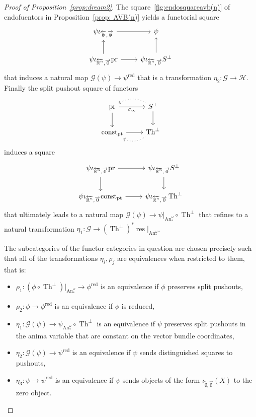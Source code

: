 \documentclass{article}
\newcommand{\R}{\mathbb{R}} %
\newcommand{\pt}{\mathrm{pt}}
\newcommand{\pr}{\mathrm{pr}}
\newcommand{\iotaemptyempty}{\iota_{\overleftarrow{\emptyset},\overrightarrow{\emptyset}}}
\newcommand{\iotarnzero}{\iota_{\overleftarrow{\R^n},\overrightarrow{0}}}
\DeclareMathOperator{\An}{An}
\DeclareMathOperator{\res}{res}
\DeclareMathOperator{\Th}{Th}
\begin{document}
\begin{proof}[Proof of Proposition~\ref{prop:dream2}]
    The square~\ref{fig:endosquareavb(n)} of endofucntors in Proposition~\ref{prop: AVB(n)} yields a functorial square 
    \[\begin{tikzcd}
        {\psi \iotaemptyempty} & \psi \\
        {\psi \iotarnzero \pr} & {\psi \iotarnzero S^\perp}
        \arrow[from=1-1, to=1-2]
        \arrow[from=2-2, to=1-2]
        \arrow[from=2-1, to=1-1]
        \arrow[from=2-1, to=2-2]
    \end{tikzcd}\]
    that induces a natural map $\mathcal G(\psi) \to \psi^\mathrm{red}$ that is a transformation $\eta_2 \colon \mathcal G \to \mathcal H$.
    Finally the split pushout square of functors 
    \[\begin{tikzcd}
        \pr & {S^\perp} \\
        {\mathrm{const}_{\pt}} & {\Th^\perp}
        \arrow["\sigma_\infty"', from=1-1, to=1-2]
        \arrow[from=1-2, to=2-2]
        \arrow[from=1-1, to=2-1]
        \arrow[from=2-1, to=2-2]
        \arrow[bend right=30, dotted, from=1-2, to=1-1]
        \arrow[bend left=30, dotted, from=2-2, to=2-1]
    \end{tikzcd}\]
    induces a square 
    \[\begin{tikzcd}
        {\psi \iotarnzero \pr} & {\psi \iotarnzero S^\perp} \\
        {\psi \iotarnzero \mathrm{const}_{\pt}} & {\psi \iotarnzero \Th^\perp}
        \arrow[from=1-1, to=1-2]
        \arrow[from=1-2, to=2-2]
        \arrow[from=1-1, to=2-1]
        \arrow[from=2-1, to=2-2]
    \end{tikzcd}\]
    that ultimately leads to a natural map $\mathcal G(\psi) \to \psi|_{\An_*^\omega} \circ \Th^\perp$ that refines 
    to a natural transformation 
    $ \eta_1 \colon \mathcal G \to (\Th^\perp)^* \res|_{\An_*^\omega}$.

    The subcategories of the functor categories in question are chosen precisely such that all of the transformations 
    $\eta_i, \rho_j$ are equivalences when restricted to them, that is:
    \begin{itemize}
        \item $\rho_1 \colon (\phi \circ \Th^\perp)|_{\An_*^\omega} \to \phi^\mathrm{red}$ is an equivalence if $\phi$ preserves split pushouts,
        \item $\rho_2 \colon \phi \to \phi^\mathrm{red}$ is an equivalence if $\phi$ is reduced,
        \item $\eta_1 \colon \mathcal G(\psi) \to \psi_{\An_*^\omega} \circ \Th^\perp$ is an equivalence if $\psi$ preserves split pushouts in the anima variable that are 
        constant on the vector bundle coordinates, 
        \item $\eta_2 \colon \mathcal G(\psi) \to \psi^\mathrm{red}$ is an equivalence if $\psi$ sends distinguished squares to pushouts,
        \item $\eta_3 \colon \psi \to \psi^\mathrm{red}$ is an equivalence if $\psi$ sends objects of the form $\iotaemptyempty(X)$ to the zero object.
    \end{itemize}

\end{proof}
\end{document}
